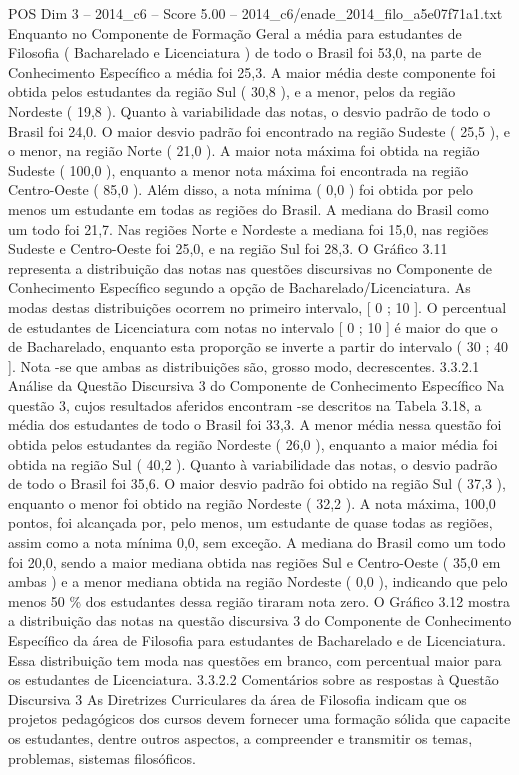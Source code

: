 \begin{textsample}{POS Dim 3 – 2014\_c6 – Score 5.00 – 2014\_c6/enade\_2014\_filo\_a5e07f71a1.txt}
Enquanto no Componente de Formação Geral a média para estudantes de Filosofia ( Bacharelado e Licenciatura ) de todo o Brasil foi 53,0, na parte de Conhecimento Específico a média foi 25,3.
A maior média deste componente foi obtida pelos estudantes da região Sul ( 30,8 ), e a menor, pelos da região Nordeste ( 19,8 ).
Quanto à variabilidade das notas, o desvio padrão de todo o Brasil foi 24,0.
O maior desvio padrão foi encontrado na região Sudeste ( 25,5 ), e o menor, na região Norte ( 21,0 ).
A maior nota máxima foi obtida na região Sudeste ( 100,0 ), enquanto a menor nota máxima foi encontrada na região Centro-Oeste ( 85,0 ).
Além disso, a nota mínima ( 0,0 ) foi obtida por pelo menos um estudante em todas as regiões do Brasil.
A mediana do Brasil como um todo foi 21,7.
Nas regiões Norte e Nordeste a mediana foi 15,0, nas regiões Sudeste e Centro-Oeste foi 25,0, e na região Sul foi 28,3.
O Gráfico 3.11 representa a distribuição das notas nas questões discursivas no Componente de Conhecimento Específico segundo a opção de Bacharelado/Licenciatura.
As modas destas distribuições ocorrem no primeiro intervalo, [ 0 ; 10 ].
O percentual de estudantes de Licenciatura com notas no intervalo [ 0 ; 10 ] é maior do que o de Bacharelado, enquanto esta proporção se inverte a partir do intervalo ( 30 ; 40 ].
Nota -se que ambas as distribuições são, grosso modo, decrescentes. 3.3.2.1 Análise da Questão Discursiva 3 do Componente de Conhecimento Específico Na questão 3, cujos resultados aferidos encontram -se descritos na Tabela 3.18, a média dos estudantes de todo o Brasil foi 33,3.
A menor média nessa questão foi obtida pelos estudantes da região Nordeste ( 26,0 ), enquanto a maior média foi obtida na região Sul ( 40,2 ).
Quanto à variabilidade das notas, o desvio padrão de todo o Brasil foi 35,6.
O maior desvio padrão foi obtido na região Sul ( 37,3 ), enquanto o menor foi obtido na região Nordeste ( 32,2 ).
A nota máxima, 100,0 pontos, foi alcançada por, pelo menos, um estudante de quase todas as regiões, assim como a nota mínima 0,0, sem exceção.
A mediana do Brasil como um todo foi 20,0, sendo a maior mediana obtida nas regiões Sul e Centro-Oeste ( 35,0 em ambas ) e a menor mediana obtida na região Nordeste ( 0,0 ), indicando que pelo menos 50 \% dos estudantes dessa região tiraram nota zero.
O Gráfico 3.12 mostra a distribuição das notas na questão discursiva 3 do Componente de Conhecimento Específico da área de Filosofia para estudantes de Bacharelado e de Licenciatura.
Essa distribuição tem moda nas questões em branco, com percentual maior para os estudantes de Licenciatura. 3.3.2.2 Comentários sobre as respostas à Questão Discursiva 3 As Diretrizes Curriculares da área de Filosofia indicam que os projetos pedagógicos dos cursos devem fornecer uma formação sólida que capacite os estudantes, dentre outros aspectos, a compreender e transmitir os temas, problemas, sistemas filosóficos.

\end{textsample}
